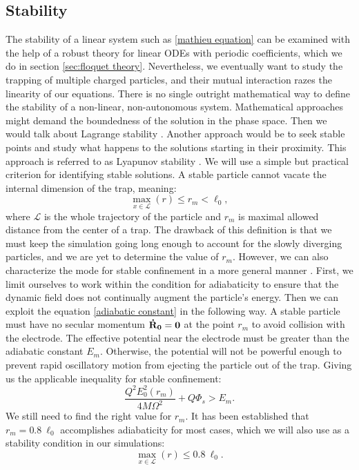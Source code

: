 \subsection{Stability} 
The stability of a linear system such as \eqref{mathieu equation} can be examined with the help of a robust theory for linear ODEs with periodic coefficients, which we do in section \ref{sec:floquet theory}. Nevertheless, we eventually want to study the trapping of multiple charged particles, and their mutual interaction razes the linearity of our equations. There is no single outright mathematical way to define the stability of a non-linear, non-autonomous system. Mathematical approaches might demand the boundedness of the solution in the phase space. Then we would talk about Lagrange stability \cite{bhatia2002stability}. Another approach would be to seek stable points and study what happens to the solutions starting in their proximity. This approach is referred to as Lyapunov stability \cite{lyapunov1992general}. We will use a simple but practical criterion for identifying stable solutions. A stable particle cannot vacate the internal dimension of the trap, meaning:
\begin{equation}
	\max\limits_{x \in \mathcal{L}}(r) \leq r_m < \ell_0,
\end{equation}
where $\mathcal{L}$ is the whole trajectory of the particle and $r_m$ is maximal allowed distance from the center of a trap. The drawback of this definition is that we must keep the simulation going long enough to account for the slowly diverging particles, and we are yet to determine the value of $r_m$. However, we can also characterize the mode for stable confinement in a more general manner \cite{gerlich1992inhomogeneous}. First, we limit ourselves to work within the condition for adiabaticity to ensure that the dynamic field does not continually augment the particle's energy. Then we can exploit the equation \eqref{adiabatic constant} in the following way. A stable particle must have no secular momentum $\vb{\dot{R}_0} = \vb{0}$ at the point $r_m$ to avoid collision with the electrode. The effective potential near the electrode must be greater than the adiabatic constant $E_m$. Otherwise, the potential will not be powerful enough to prevent rapid oscillatory motion from ejecting the particle out of the trap. Giving us the applicable inequality for stable confinement:
\begin{equation}
	\label{stability condition inequality}
	\dfrac{Q^2 E_0^2(r_m)}{4 M \Omega^2} + Q\Phi_s > E_m.
\end{equation}
We still need to find the right value for $r_m$. It has been established \cite{gerlich1992inhomogeneous} that $r_m = 0.8 \ \ell_0$ accomplishes adiabaticity for most cases, which we will also use as a stability condition in our simulations:
\begin{equation}
	\label{stability condition in simulation}
	\max\limits_{x \in \mathcal{L}}(r) \leq 0.8 \ \ell_0.
\end{equation}

